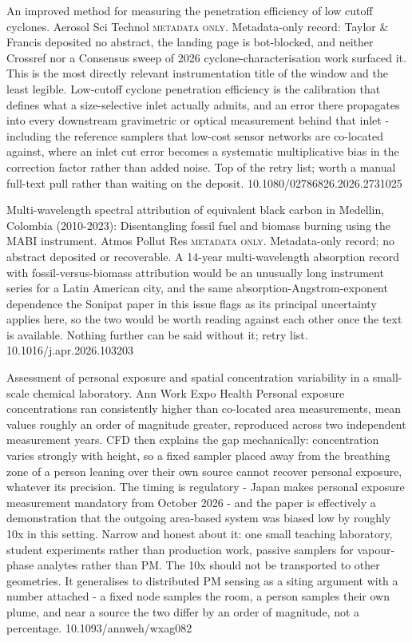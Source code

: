 \documentclass[10pt]{article}
\begin{document}
{An improved method for measuring the penetration efficiency of low cutoff cyclones.}
{Aerosol Sci Technol}
{\textsc{metadata only.} Metadata-only record: Taylor \& Francis deposited no abstract, the landing page is bot-blocked, and neither Crossref nor a Consensus sweep of 2026 cyclone-characterisation work surfaced it. This is the most directly relevant instrumentation title of the window and the least legible. Low-cutoff cyclone penetration efficiency is the calibration that defines what a size-selective inlet actually admits, and an error there propagates into every downstream gravimetric or optical measurement behind that inlet - including the reference samplers that low-cost sensor networks are co-located against, where an inlet cut error becomes a systematic multiplicative bias in the correction factor rather than added noise. Top of the retry list; worth a manual full-text pull rather than waiting on the deposit.}
{10.1080/02786826.2026.2731025}

{Multi-wavelength spectral attribution of equivalent black carbon in Medellin, Colombia (2010-2023): Disentangling fossil fuel and biomass burning using the MABI instrument.}
{Atmos Pollut Res}
{\textsc{metadata only.} Metadata-only record; no abstract deposited or recoverable. A 14-year multi-wavelength absorption record with fossil-versus-biomass attribution would be an unusually long instrument series for a Latin American city, and the same absorption-Angstrom-exponent dependence the Sonipat paper in this issue flags as its principal uncertainty applies here, so the two would be worth reading against each other once the text is available. Nothing further can be said without it; retry list.}
{10.1016/j.apr.2026.103203}


{Assessment of personal exposure and spatial concentration variability in a small-scale chemical laboratory.}
{Ann Work Expo Health}
{Personal exposure concentrations ran consistently higher than co-located area measurements, mean values roughly an order of magnitude greater, reproduced across two independent measurement years. CFD then explains the gap mechanically: concentration varies strongly with height, so a fixed sampler placed away from the breathing zone of a person leaning over their own source cannot recover personal exposure, whatever its precision. The timing is regulatory - Japan makes personal exposure measurement mandatory from October 2026 - and the paper is effectively a demonstration that the outgoing area-based system was biased low by roughly 10x in this setting. Narrow and honest about it: one small teaching laboratory, student experiments rather than production work, passive samplers for vapour-phase analytes rather than PM. The 10x should not be transported to other geometries. It generalises to distributed PM sensing as a siting argument with a number attached - a fixed node samples the room, a person samples their own plume, and near a source the two differ by an order of magnitude, not a percentage.}
{10.1093/annweh/wxag082}
\end{document}
